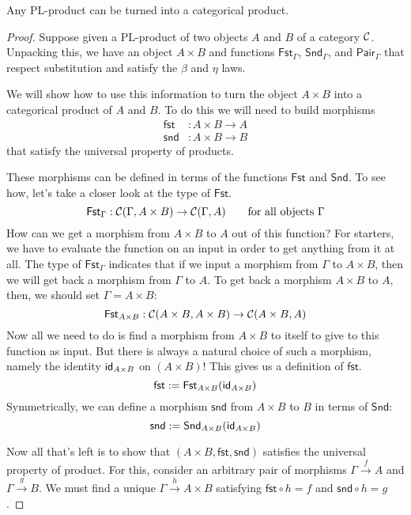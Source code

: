 \begin{construction} \label{cons:pl-prod-to-prod}
  Any PL-product can be turned into a categorical product.
\end{construction}
\begin{proof}
  Suppose given a PL-product of two objects \(A\) and \(B\) of a category \(\mathcal C\).
  Unpacking this, we have an object \(A \times B\)
  and functions \(\mathsf{Fst}_\Gamma\), \(\mathsf{Snd}_\Gamma\), and \(\mathsf{Pair}_\Gamma\)
  that respect substitution and satisfy the \(\beta\) and \(\eta\) laws.

  We will show how to use this information to turn the object \(A \times B\)
  into a categorical product of \(A\) and \(B\).
  To do this we will need to build morphisms
  \begin{align*}
  \mathsf{fst} &: A \times B \to A\\
  \mathsf{snd} &: A \times B \to B
  \end{align*}
  that satisfy the universal property of products.

  These morphisms can be defined in terms of the functions \(\mathsf{Fst}\) and \(\mathsf{Snd}\).
  To see how, let's take a closer look at the type of \(\mathsf{Fst}\).
  \[
    \mathsf{Fst}_\Gamma : \mathcal C(\Gamma, A\times B) \to \mathcal C(\Gamma, A)
    \qquad\text{for all objects \(\Gamma\)}
  \]
  How can we get a morphism from \(A \times B\) to \(A\) out of this function?
  For starters, we have to evaluate the function on an input in order to get anything from it at all.
  The type of \(\mathsf{Fst}_\Gamma\) indicates that if we input a morphism from \(\Gamma\) to \(A \times B\),
  then we will get back a morphism from \(\Gamma\) to \(A\).
  To get back a morphism \(A \times B\) to \(A\), then, we should set \(\Gamma = A \times B\):
  \[
    \mathsf{Fst}_{A\times B}: \mathcal C(A \times B, A\times B) \to \mathcal C(A \times B, A)
  \]
  Now all we need to do is find a morphism from \(A \times B\) to itself to give
  to this function as input. But there is always a natural choice of such a morphism, namely the identity \(\mathsf{id}_{A\times B}\) on \((A \times B)\)!
  This gives us a definition of \(\mathsf{fst}\).
  \[
    \mathsf{fst} := \mathsf{Fst}_{A\times B}(\mathsf{id}_{A\times B})
  \]
  Symmetrically, we can define a morphism \(\mathsf{snd}\) from \(A \times B\) to \(B\)
  in terms of \(\mathsf{Snd}\):
  \[
    \mathsf{snd} := \mathsf{Snd}_{A\times B}(\mathsf{id}_{A\times B})
  \]

  Now all that's left is to show that \((A\times B, \mathsf{fst},\mathsf{snd})\) satisfies the universal property
  of product. For this, consider an arbitrary pair of morphisms \(\Gamma \xrightarrow{f} A\) and \(\Gamma\xrightarrow{g} B\).
  We must find a unique \(\Gamma \xrightarrow{h} A \times B\) satisfying \(\mathsf{fst} \circ h = f\) and \(\mathsf{snd} \circ h = g\).


\end{proof}
